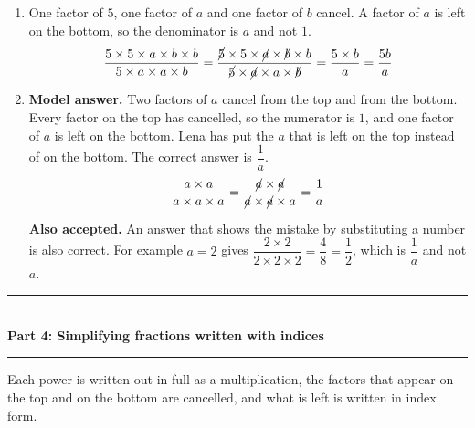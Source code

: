 \documentclass[12pt,a4paper]{article}
\newcommand{\heading}[1]{%
  \vspace{2pt}
  {\color{blue!45!black}\rule{\linewidth}{1pt}}\\[1pt]
  {\large\bfseries #1}\\[-6pt]
  {\color{blue!45!black}\rule{\linewidth}{0.4pt}}
  \vspace{2pt}}
\newcommand{\parttitle}[2]{\heading{Part #1: #2}}
\newcommand{\modelans}{\par\smallskip
  \noindent\textbf{\color{blue!50!black}Model answer.}\space}
\newcommand{\alsoacc}{\par\smallskip
  \noindent\textbf{\color{blue!50!black}Also accepted.}\space}
\begin{document}
\begin{enumerate}
\item One factor of $5$, one factor of $a$ and one factor of $b$ cancel. A
factor of $a$ is left on the bottom, so the denominator is $a$ and not $1$.
\[\frac{5\times5\times a\times b\times b}{5\times a\times a\times b}
  =\frac{\cancel{5}\times5\times\cancel{a}\times\cancel{b}\times b}
   {\cancel{5}\times\cancel{a}\times a\times\cancel{b}}
  =\frac{5\times b}{a}=\frac{5b}{a}\]

\item
\modelans
Two factors of $a$ cancel from the top and from the bottom. Every factor on the
top has cancelled, so the numerator is $1$, and one factor of $a$ is left on the
bottom. Lena has put the $a$ that is left on the top instead of on the bottom.
The correct answer is $\dfrac{1}{a}$.
\[\frac{a\times a}{a\times a\times a}
  =\frac{\cancel{a}\times\cancel{a}}{\cancel{a}\times\cancel{a}\times a}
  =\frac{1}{a}\]
\alsoacc
An answer that shows the mistake by substituting a number is also correct. For
example $a=2$ gives $\dfrac{2\times2}{2\times2\times2}=\dfrac{4}{8}=\dfrac{1}{2}$,
which is $\dfrac{1}{a}$ and not $a$.
\end{enumerate}

\newpage

\parttitle{4}{Simplifying fractions written with indices}

Each power is written out in full as a multiplication, the factors that appear
on the top and on the bottom are cancelled, and what is left is written in
index form.
\end{document}
